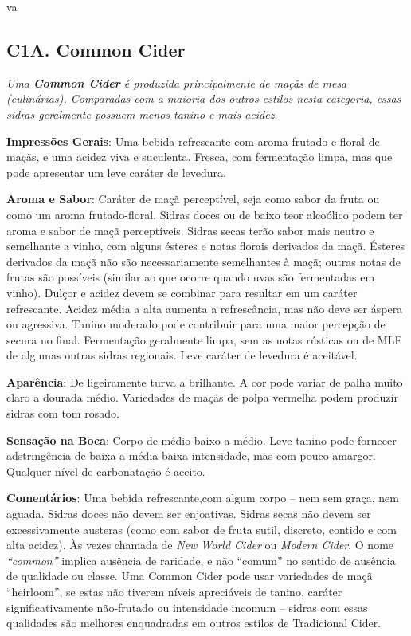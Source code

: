 va
\subsection*{C1A. Common Cider}

\textit{Uma \textbf{Common Cider} é produzida principalmente de maçãs de mesa (culinárias). Comparadas com a maioria dos outros estilos nesta categoria, essas sidras geralmente possuem menos tanino e mais acidez.}

\textbf{Impressões Gerais}: Uma bebida refrescante com aroma frutado e floral de maçãs, e uma acidez viva e suculenta. Fresca, com fermentação limpa, mas que pode apresentar um leve caráter de levedura.

\textbf{Aroma e Sabor}: Caráter de maçã perceptível, seja como sabor da fruta ou como um aroma frutado-floral. Sidras doces ou de baixo teor alcoólico podem ter aroma e sabor de maçã perceptíveis. Sidras secas terão sabor mais neutro e semelhante a vinho, com alguns ésteres e notas florais derivados da maçã. Ésteres derivados da maçã não são necessariamente semelhantes à maçã; outras notas de frutas são possíveis (similar ao que ocorre quando uvas são fermentadas em vinho). Dulçor e acidez devem se combinar para resultar em um caráter refrescante. Acidez média a alta aumenta a refrescância, mas não deve ser áspera ou agressiva. Tanino moderado pode contribuir para uma maior percepção de secura no final. Fermentação geralmente limpa, sem as notas rústicas ou de MLF de algumas outras sidras regionais. Leve caráter de levedura é aceitável.

\textbf{Aparência}: De ligeiramente turva a brilhante. A cor pode variar de palha muito claro a dourada médio. Variedades de maçãs de polpa vermelha podem produzir sidras com tom rosado.

\textbf{Sensação na Boca}: Corpo de médio-baixo a médio. Leve tanino pode fornecer adstringência de baixa a média-baixa intensidade, mas com pouco amargor. Qualquer nível de carbonatação é aceito.

\textbf{Comentários}: Uma bebida refrescante,com algum corpo – nem sem graça, nem aguada. Sidras doces não devem ser enjoativas. Sidras secas não devem ser excessivamente austeras (como com sabor de fruta sutil, discreto, contido e com alta acidez). Às vezes chamada de \textit{New World Cider} ou \textit{Modern Cider}. O nome \textit{“common”} implica ausência de raridade, e não “comum” no sentido de ausência de qualidade ou classe. Uma Common Cider pode usar variedades de maçã “heirloom”, se estas não tiverem níveis apreciáveis de tanino, caráter significativamente não-frutado ou intensidade incomum – sidras com essas qualidades são melhores enquadradas em outros estilos de Tradicional Cider.

